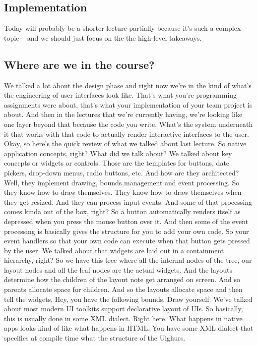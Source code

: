 \subsection{Implementation}
Today will probably be a shorter lecture partially because it's such a complex topic -- and we should just focus on the the high-level takeaways.

\subsection{Where are we in the course?}
We talked a lot about the design phase and right now we're in the kind of what's the engineering of user interfaces look like. That's what you're programming assignments were about, that's what your implementation of your team project is about. And then in the lectures that we're currently having, we're looking like one layer beyond that because the code you write, What's the system underneath it that works with that code to actually render interactive interfaces to the user. Okay, so here's the quick review of what we talked about last lecture. So native application concepts, right? What did we talk about? We talked about key concepts or widgets or controls. Those are the templates for buttons, date pickers, drop-down menus, radio buttons, etc. And how are they architected? Well, they implement drawing, bounds management and event processing. So they know how to draw themselves. They know how to draw themselves when they get resized. And they can process input events. And some of that processing comes kinda out of the box, right? So a button automatically renders itself as depressed when you press the mouse button over it. And then some of the event processing is basically gives the structure for you to add your own code. So your event handlers so that your own code can execute when that button gets pressed by the user. We talked about that widgets are laid out in a containment hierarchy, right? So we have this tree where all the internal nodes of the tree, our layout nodes and all the leaf nodes are the actual widgets. And the layouts determine how the children of the layout note get arranged on screen. And so parents allocate space for children. And so the layouts allocate space and then tell the widgets, Hey, you have the following bounds. Draw yourself. We've talked about most modern UI toolkits support declarative layout of UIs. So basically, this is usually done in some XML dialect. Right here. What happens in native apps looks kind of like what happens in HTML. You have some XML dialect that specifies at compile time what the structure of the Uighurs. 

